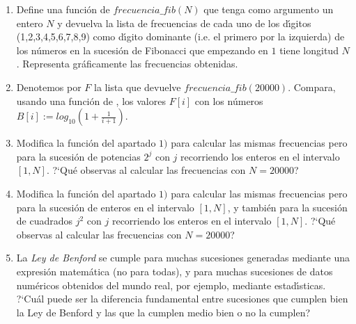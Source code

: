 \begin{ejer}

\begin{enumerate}
\item Define una función de {\sage}  $frecuencia\_fib(N)$ que tenga como 
argumento un entero $N$ y devuelva la lista de frecuencias de cada uno de los 
d\'{\i}gitos (1,2,3,4,5,6,7,8,9) como d\'{\i}gito dominante (i.e. el primero 
por la izquierda) de los n\'umeros en la sucesi\'on de Fibonacci que empezando 
en $1$  tiene  longitud $N$. Representa  gr\'aficamente las frecuencias 
obtenidas. 
\item Denotemos por $F$ la lista que devuelve $frecuencia\_fib(20000)$. 
Compara, usando una funci\'on de {\sage}, los valores $F[i]$ con los números  
$B[i]:=log_{10}(1+\frac{1}{i+1})$.  

\item Modifica la funci\'on del apartado $1)$ para calcular las mismas 
frecuencias pero para la sucesi\'on de potencias $2^j$ con $j$ recorriendo los 
enteros en el intervalo $[1,N]$. ?`Qu\'e observas al calcular las frecuencias 
con $N=20000$?
\item Modifica  la función del apartado $1)$ para calcular las mismas 
frecuencias pero para la sucesión de enteros en el intervalo $[1,N]$, y también 
para la sucesión de  cuadrados  $j^2$ con $j$ recorriendo los enteros en el 
intervalo $[1,N]$. ?`Qu\'e  observas al calcular las frecuencias con $N=20000$?
\item La {\itshape Ley de Benford} se cumple para muchas sucesiones generadas 
mediante una expresi\'on matem\'atica (no para todas), y para muchas sucesiones 
de datos num\'ericos obtenidos del mundo real, por ejemplo, mediante 
estad\'{\i}sticas. ?`Cu\'al puede ser la   diferencia fundamental entre 
sucesiones que cumplen bien la Ley de Benford y las que la cumplen medio bien o 
no la cumplen?

\end{enumerate}
\end{ejer}










